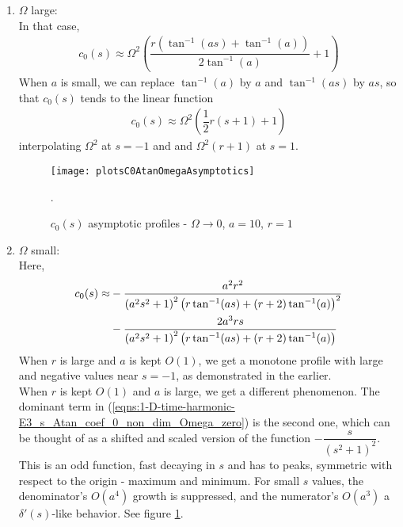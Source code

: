 \documentclass[12pt,twoside]{report}
\begin{document}
\begin{enumerate}
\item $\Omega$ large:\\
	In that case, 
	\begin{align}
	c_0(s) \approx \Omega ^2 \left(\dfrac{r \left(\tan ^{-1}(a s)+\tan ^{-1}(a)\right)}{2 \tan ^{-1}(a)}+1\right)
	\end{align}
	When $a$ is small, we can replace $\tan^{-1}(a)$ by $a$ and $\tan^{-1}(as)$ by $as$, so that $c_0(s)$ tends to the linear function
	\begin{align}
	c_0(s) \approx \Omega ^2\left( \dfrac{1}{2} r (s+1) + 1 \right)
	\end{align}
	interpolating $\Omega^2$ at $s=-1$ and  and $\Omega^2(r+1)$ at $s=1$.
\begin{figure} 
\begin{center}
\texttt{[image: plotsC0AtanOmegaAsymptotics]}
\end{center}
\caption {$c_0(s)$ asymptotic profiles - $\Omega \rightarrow 0$, $a = 10$, $r = 1$}.

\label{fig:c0AtanOmegalim}
\end{figure}
	
\item $\Omega$ small:\\
Here, 
	\begin{align}
	\label{eqns:1-D-time-harmonic-E3_s_Atan_coef_0_non_dim_Omega_zero}
	c_0(s) \approx &-\dfrac{a^2 r^2}{\left(a^2 s^2+1\right)^2 \left(r \tan ^{-1}(a s)+(r+2)
   \tan ^{-1}(a)\right)^2} \notag \\
   &-\dfrac{2 a^3 r s}{\left(a^2 s^2+1\right)^2
   \left(r \tan ^{-1}(a s)+(r+2) \tan ^{-1}(a)\right)}
	\end{align}
When $r$ is large and $a$ is kept $O(1)$, we get a monotone profile with large and negative values near $s=-1$, as demonstrated in the earlier. \\
	When $r$ is kept $O(1)$ and $a$ is large, we get a different phenomenon. The dominant term in (\ref{eqns:1-D-time-harmonic-E3_s_Atan_coef_0_non_dim_Omega_zero}) is the second one, which can be thought of as a shifted and scaled version of the function $-\dfrac{s}{(s^2 +1)^2}$. This is an odd function, fast decaying in $s$ and has to peaks, symmetric with respect to the origin - maximum and minimum. For small $s$ values, the denominator's $O(a^4)$ growth is suppressed, and the numerator's $O(a^3)$ a $\delta'(s)$-like behavior. See figure \ref{fig:c0AtanOmegalim}.
	



\end{enumerate}
\end{document}
